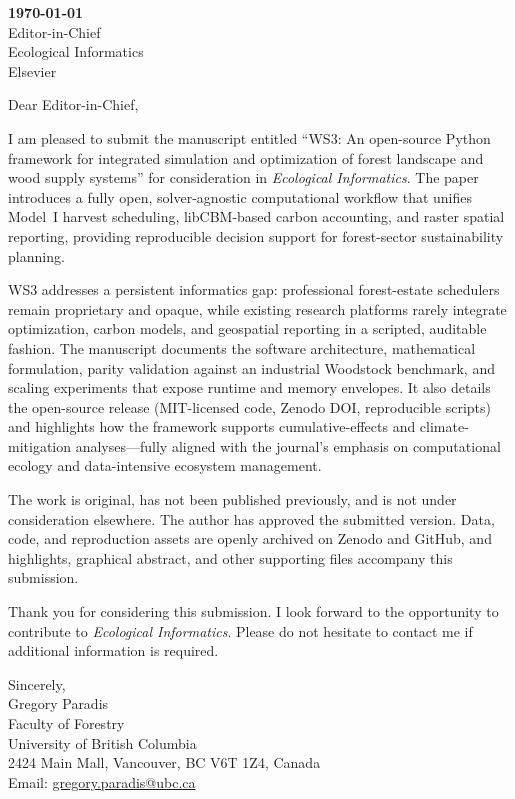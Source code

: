 \documentclass[11pt]{article}
\begin{document}

\noindent\textbf{\today} \\[1em]
\noindent Editor-in-Chief \\Ecological Informatics \\Elsevier

\bigskip

\noindent Dear Editor-in-Chief, 

\medskip

I am pleased to submit the manuscript entitled ``WS3: An open-source Python framework for integrated simulation and optimization of forest landscape and wood supply systems'' for consideration in \emph{Ecological Informatics}. The paper introduces a fully open, solver-agnostic computational workflow that unifies Model~I harvest scheduling, libCBM-based carbon accounting, and raster spatial reporting, providing reproducible decision support for forest-sector sustainability planning.

WS3 addresses a persistent informatics gap: professional forest-estate schedulers remain proprietary and opaque, while existing research platforms rarely integrate optimization, carbon models, and geospatial reporting in a scripted, auditable fashion. The manuscript documents the software architecture, mathematical formulation, parity validation against an industrial Woodstock benchmark, and scaling experiments that expose runtime and memory envelopes. It also details the open-source release (MIT-licensed code, Zenodo DOI, reproducible scripts) and highlights how the framework supports cumulative-effects and climate-mitigation analyses—fully aligned with the journal’s emphasis on computational ecology and data-intensive ecosystem management.

The work is original, has not been published previously, and is not under consideration elsewhere. The author has approved the submitted version. Data, code, and reproduction assets are openly archived on Zenodo and GitHub, and highlights, graphical abstract, and other supporting files accompany this submission.

Thank you for considering this submission. I look forward to the opportunity to contribute to \emph{Ecological Informatics}. Please do not hesitate to contact me if additional information is required.

\bigskip

\noindent Sincerely, \\[0.75em]
\noindent Gregory Paradis \\Faculty of Forestry \\University of British Columbia \\2424 Main Mall, Vancouver, BC V6T 1Z4, Canada \\Email: \href{mailto:gregory.paradis@ubc.ca}{gregory.paradis@ubc.ca}
\end{document}
